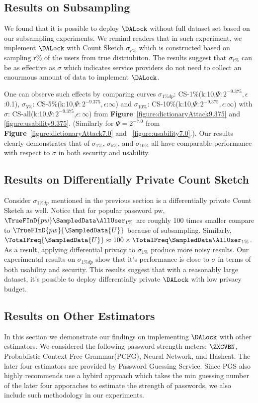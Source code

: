 
\subsection{Results on Subsampling}
We found that it is possible to deploy $\DALock$ without full dataset set based on our subsampling experiments. We remind readers that in such experiment, we implement $\DALock$ with Count Sketch $\sigma_{r\%}$ which is constructed based on sampling r\% of the users from true distriubiton. The results suggest that $\sigma_{r\%}$ can be as effective as $\sigma$ which indicates service providers do not need to collect an enourmous amount of data to implement $\DALock$.

One can observe such effects by comparing curves $\sigma_{1\% dp}$: CS-1\%(k:10,$\Psi:2^{-9.375},\epsilon$:0.1), $\sigma_{5\%}$: CS-5\%(k:10,$\Psi:2^{-9.375},\epsilon$:$\infty$) and $\sigma_{10\%}$: CS-10\%(k:10,$\Psi:2^{-9.375},\epsilon$:$\infty$) with $\sigma$: CS-all(k:10,$\Psi:2^{-9.375}$,$\epsilon:\infty$) from \textbf{Figure}~\ref{figure:dictionaryAttack9.375} and \ref{figure:usability9.375}. (Similarly for $\Psi = 2^{-7.0}$ from \textbf{Figure}~\ref{figure:dictionaryAttack7.0} and ~\ref{figure:usability7.0}.). Our results clearly demonstrates that of $\sigma_{1\%}$, $\sigma_{5\%}$, and $\sigma_{10\%}$ all have comparable performance with respect to $\sigma$ in both security and usability. 

\subsection{Results on Differentially Private Count Sketch}
Consider $\sigma_{1\%dp}$ mentioned in the previous section is a differentially private Count Sketch as well. Notice that for popular password pw, $\TrueFInD{pw}{\SampledData{\AllUser_{1\%}}}$ are roughly 100 times smaller compare to $\TrueFInD{pw}{\SampledData{U}}$ because of subsampling. Similarly, $\TotalFreq{\SampledData{U}} \approx 100\times \TotalFreq{\SampledData{\AllUser_{1\%}}}$. As a result, applying differential privacy to $\sigma_{1\%}$ produce more noisy results. Our experimental results on $\sigma_{1\%dp}$ show that it's performance is close to $\sigma$ in terms of both usability and security. This results suggest that with a reasonably large dataset, it's possible to deploy differentially private $\DALock$ with low privacy budget.

\subsection{Results on Other Estimators}
In this section we demonstrate our findings on implementing $\DALock$ with other estimators. We considered the following password strength meters: $\ZXCVBN$\cite{USENIX:Wheeler16}, Probablistic Context Free Grammar(PCFG), Neural Network, and Hashcat. The later four estimators are provided by Password Guessing Service\cite{USENIX:USBCCKKMMS15}. Since PGS also highly recommends use a hybird approach which takes the min guessing number of the later four apporaches to estimate the strength of passwords, we also include such methodology in our experiments. 


